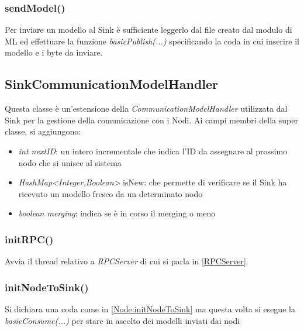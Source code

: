      \subsubsection{sendModel()}
        Per inviare un modello al Sink è sufficiente leggerlo dal file creato dal modulo di ML ed effettuare la funzione \textit{basicPublish(...)} specificando la coda in cui inserire il modello e i byte da inviare.
        

    \subsection{SinkCommunicationModelHandler}
      Questa classe è un'estensione della \textit{CommunicationModelHandler} utilizzata dal Sink per la gestione della comunicazione con i Nodi. Ai campi membri della super classe, si aggiungono:
      \begin{itemize}
        \item \textit{int nextID}: un intero incrementale che indica l'ID da assegnare al prossimo nodo che si unisce al sistema
        \item \textit{HashMap<Integer,Boolean>} isNew: che permette di verificare se il Sink ha ricevuto un modello fresco da un determinato nodo
        \item \textit{boolean merging}: indica se è in corso il merging o meno
      \end{itemize}

      \subsubsection{initRPC()}
        Avvia il thread relativo a \textit{RPCServer} di cui si parla in \ref{RPCServer}.
        

      \subsubsection{initNodeToSink()}
        Si dichiara una coda come in \ref{Node:initNodeToSink} ma questa volta si esegue la \textit{basicConsume(...)} per stare in ascolto dei modelli inviati dai nodi
        

